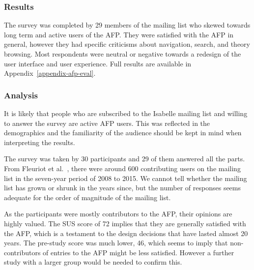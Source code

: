 \documentclass[bsc,frontabs,oneside,singlespacing,parskip,deptreport,logo]{infthesis}
\begin{document}

\subsubsection{Results} \label{mailingListResults}
\cbstart
The survey was completed by 29 members of the mailing list who skewed towards long term and active users of the AFP\@. They were satisfied with the AFP in general, however they had specific criticisms about navigation, search, and theory browsing. Most respondents were neutral or negative towards a redesign of the user interface and user experience. Full results are available in Appendix~\ref{appendix-afp-eval}.
\cbend

\subsubsection{Analysis}

It is likely that people who are subscribed to the Isabelle mailing list and willing to answer the survey are active AFP users. This was reflected in the demographics and the familiarity of the audience should be kept in mind when interpreting the results.\smallskip

The survey was taken by 30 participants and 29 of them answered all the parts. From Fleuriot et al.\ \cite{fleuriot2016social}, there were around 600 contributing users on the mailing list in the seven-year period of 2008 to 2015. We cannot tell whether the mailing list has grown or shrunk in the years since, but the number of responses seems adequate for the order of magnitude of the mailing list.\smallskip

As the participants were mostly contributors to the AFP, their opinions are highly valued. The SUS score of 72 implies that they are generally satisfied with the AFP, which is a testament to the design decisions that have lasted almost 20 years. The pre-study score was much lower, 46, which seems to imply that non-contributors of entries to the AFP might be less satisfied. However a further study with a larger group would be needed to confirm this.\smallskip
\end{document}
